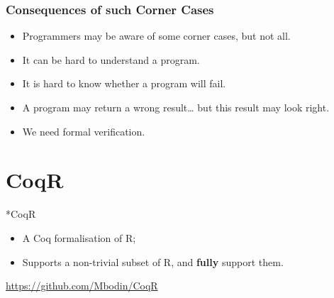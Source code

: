 \documentclass{beamer}
\newcommand\emphb{\textbf}
\begin{document}
\begin{frame}
  \frametitle{Consequences of such Corner Cases}

  \begin{itemize}
    \item Programmers may be aware of some corner cases, but not all.
    \item It can be hard to understand a program.
    \item It is hard to know whether a program will fail.
    \item A program may return a wrong result… but this result may look right.
    \item We need formal verification.
  \end{itemize}

\end{frame}

\section{CoqR}

\sectionframe**{CoqR}{

    \begin{itemize}
        \item A Coq formalisation of R;
        \item Supports a non-trivial subset of R, and \emphb{fully} support them.
    \end{itemize}

    \begin{center}
    \url{https://github.com/Mbodin/CoqR}
    \end{center}
}
\end{document}
